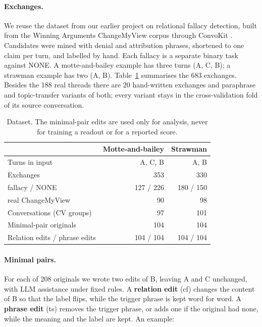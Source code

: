 \documentclass[11pt]{article}
\begin{document}
\paragraph{Exchanges.} We reuse the dataset from our earlier project on relational fallacy detection, built from the Winning Arguments ChangeMyView corpus \citep{tan2016winning} through ConvoKit \citep{chang2020convokit}. Candidates were mined with denial and attribution phrases, shortened to one claim per turn, and labelled by hand. Each fallacy is a separate binary task against NONE. A motte-and-bailey example has three turns (A, C, B); a strawman example has two (A, B). Table~\ref{tab:data} summarises the 683 exchanges. Besides the 188 real threads there are 20 hand-written exchanges and paraphrase and topic-transfer variants of both; every variant stays in the cross-validation fold of its source conversation.

\begin{table}[t]
\centering
\small
\begin{tabular}{lrr}
\toprule
 & Motte-and-bailey & Strawman \\
\midrule
Turns in input & A, C, B & A, B \\
Exchanges & 353 & 330 \\
\quad fallacy / NONE & 127 / 226 & 180 / 150 \\
\quad real ChangeMyView & 90 & 98 \\
Conversations (CV groups) & 97 & 101 \\
Minimal-pair originals & 104 & 104 \\
Relation edits / phrase edits & 104 / 104 & 104 / 104 \\
\bottomrule
\end{tabular}
\caption{Dataset. The minimal-pair edits are used only for analysis, never for training a readout or for a reported score.}
\label{tab:data}
\end{table}

\paragraph{Minimal pairs.} For each of 208 originals we wrote two edits of B, leaving A and C unchanged, with LLM assistance under fixed rules. A \textbf{relation edit} (cf) changes the content of B so that the label flips, while the trigger phrase is kept word for word. A \textbf{phrase edit} (ts) removes the trigger phrase, or adds one if the original had none, while the meaning and the label are kept. An example:
\end{document}
